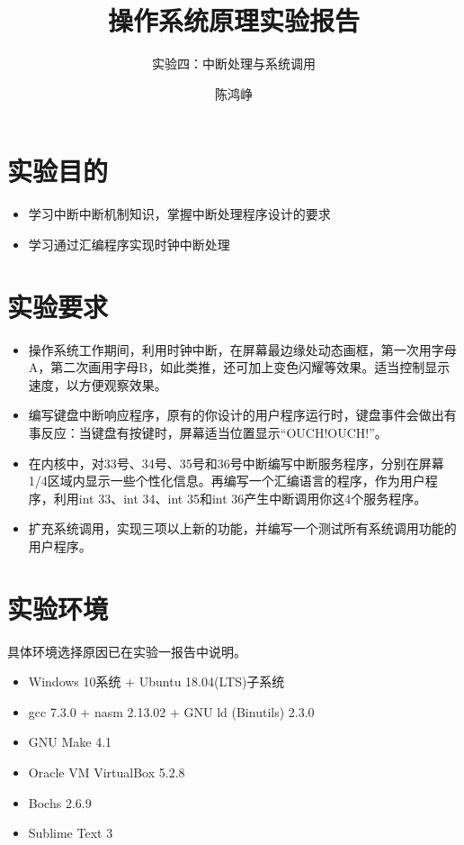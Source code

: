 \documentclass[logo,reportComp]{thesis}
\title{操作系统原理实验报告}
\subtitle{实验四：中断处理与系统调用}
\author{陈鸿峥}
\begin{document}
\maketitle

\section{实验目的}
\begin{itemize}
	\item 学习中断中断机制知识，掌握中断处理程序设计的要求
	\item 学习通过汇编程序实现时钟中断处理
\end{itemize}

\section{实验要求}
\begin{itemize}
	\item 操作系统工作期间，利用时钟中断，在屏幕最边缘处动态画框，第一次用字母A，第二次画用字母B，如此类推，还可加上变色闪耀等效果。适当控制显示速度，以方便观察效果。
	\item 编写键盘中断响应程序，原有的你设计的用户程序运行时，键盘事件会做出有事反应：当键盘有按键时，屏幕适当位置显示``OUCH!OUCH!''。
	\item 在内核中，对33号、34号、35号和36号中断编写中断服务程序，分别在屏幕1/4区域内显示一些个性化信息。再编写一个汇编语言的程序，作为用户程序，利用int 33、int 34、int 35和int 36产生中断调用你这4个服务程序。
	\item 扩充系统调用，实现三项以上新的功能，并编写一个测试所有系统调用功能的用户程序。
\end{itemize}

\section{实验环境}
具体环境选择原因已在实验一报告中说明。
\begin{itemize}
	\item Windows 10系统 + Ubuntu 18.04(LTS)子系统
	\item gcc 7.3.0 + nasm 2.13.02 + GNU ld (Binutils) 2.3.0
    \item GNU Make 4.1
	\item Oracle VM VirtualBox 5.2.8
    \item Bochs 2.6.9
	\item Sublime Text 3
\end{itemize}
\end{document}
